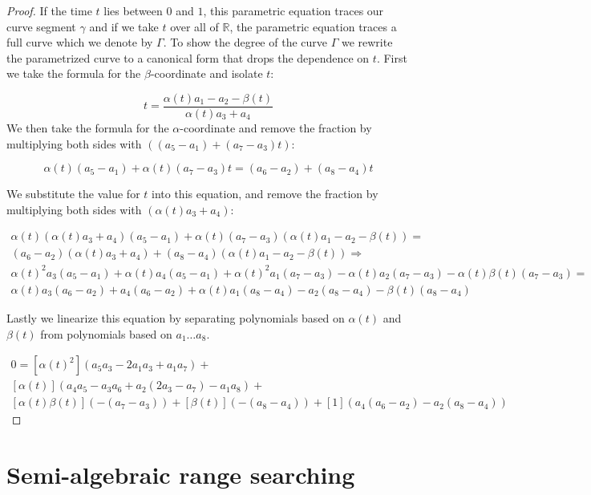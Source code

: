 \documentclass[UKenglish]{lipics-v2019}
\begin{document}
\begin{proof}
  If the time $t$ lies between $0$ and $1$, this parametric equation traces our curve segment $\gamma$ and if we take $t$ over all of $\mathbb{R}$, the parametric equation traces a full curve which we denote by $\Gamma$. To show the degree of the curve $\Gamma$ we rewrite the parametrized curve to a canonical form that drops the dependence on $t$. First we take the formula for the $\beta$-coordinate and isolate $t$:
  
  \[
     t = \frac{\alpha(t) a_1 - a_2  - \beta(t)}{\alpha(t) a_3 + a_4}
  \]
We then take the formula for the $\alpha$-coordinate and remove the fraction by multiplying both sides with $ ((a_5 - a_1)  + (a_7 - a_3) t)$:

\[ 
\alpha(t)(a_5 - a_1)  + \alpha(t)(a_7 - a_3) t = (a_6 - a_2) + (a_8 - a_4) t
\]

We substitute the value for $t$ into this equation, and remove the fraction by multiplying both sides with $(\alpha(t) a_3 + a_4)$:

\begin{align*}
\alpha(t)(\alpha(t) a_3 + a_4)(a_5 - a_1)  + \alpha(t)(a_7 - a_3) (\alpha(t) a_1 - a_2  - \beta(t)) = \\
(a_6 - a_2)(\alpha(t) a_3 + a_4) + (a_8 - a_4) (\alpha(t) a_1 - a_2  - \beta(t)) \Rightarrow \\
\alpha(t)^2a_3(a_5 - a_1) + \alpha(t)a_4(a_5 - a_1)  + \alpha(t)^2a_1(a_7 - a_3)
- \alpha(t)a_2(a_7 - a_3)  - \alpha(t)\beta(t)(a_7 - a_3) = \\
\alpha(t) a_3(a_6 - a_2) + a_4(a_6 - a_2) + \alpha(t)a_1(a_8 - a_4) - a_2 (a_8 - a_4) - \beta(t)(a_8 - a_4) 
\end{align*}

Lastly we linearize this equation by separating polynomials based on $\alpha(t)$ and $\beta(t)$ from polynomials based on $a_1 \ldots a_8$.

\begin{align}
\label{eq:hyperbola}
    0= [\alpha(t)^2](a_5 a_3 -2 a_1 a_3 + a_1 a_7)+ \\
    [\alpha(t)](a_4 a_5 - a_3 a_6 + a_2 (2 a_3 - a_7) - a_1 a_8) + \\
    [\alpha(t)\beta(t)](-(a_7 - a_3)) + [\beta(t)](-(a_8 - a_4)) + [1](a_4(a_6 - a_2)- a_2 (a_8 - a_4))
\end{align}
\end{proof}


\section{Semi-algebraic range searching}
\label{appx:rangesearch}
\end{document}
